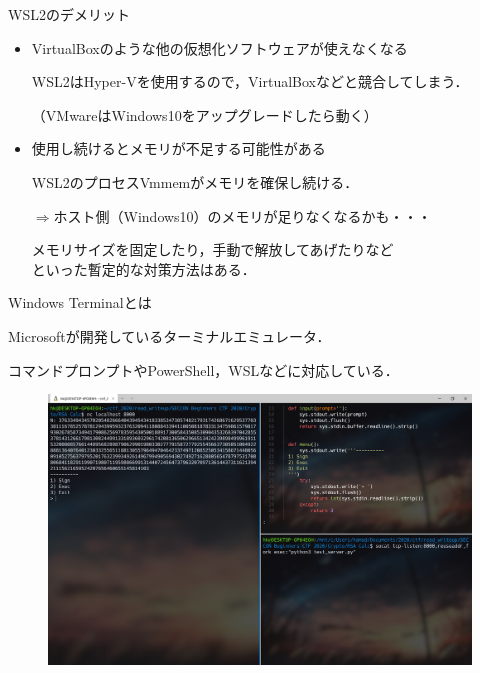 \documentclass[dvipsnames,usenames,aspectratio=169,12pt]{beamer}
\begin{document}
\begin{frame}{WSL2のデメリット}

\begin{itemize}
\item VirtualBoxのような他の仮想化ソフトウェアが\alert{使えなくなる}
\vspace{5pt}

WSL2はHyper-Vを使用するので，VirtualBoxなどと\alert{競合}してしまう．

\vspace{3pt}
（VMwareはWindows10をアップグレードしたら動く）

\vspace{15pt}

\item 使用し続けるとメモリが\alert{不足する}可能性がある
\vspace{5pt}

WSL2のプロセスVmmemがメモリを確保し続ける．

\vspace{5pt}
\hspace{10pt}$\Longrightarrow$ホスト側（Windows10）のメモリが足りなくなるかも・・・
\vspace{5pt}

メモリサイズを固定したり，手動で解放してあげたりなど
\\\vspace{3pt}といった暫定的な対策方法はある．

\end{itemize}

\end{frame}

\begin{frame}{Windows Terminalとは}

Microsoftが開発している\alert{ターミナルエミュレータ}．

\vspace{3pt}
コマンドプロンプトやPowerShell，WSLなどに対応している．

\begin{figure}[h]
\centering
\includegraphics[scale=0.2]{./fig/myterminal.png}
\end{figure}
\end{frame}
\end{document}
